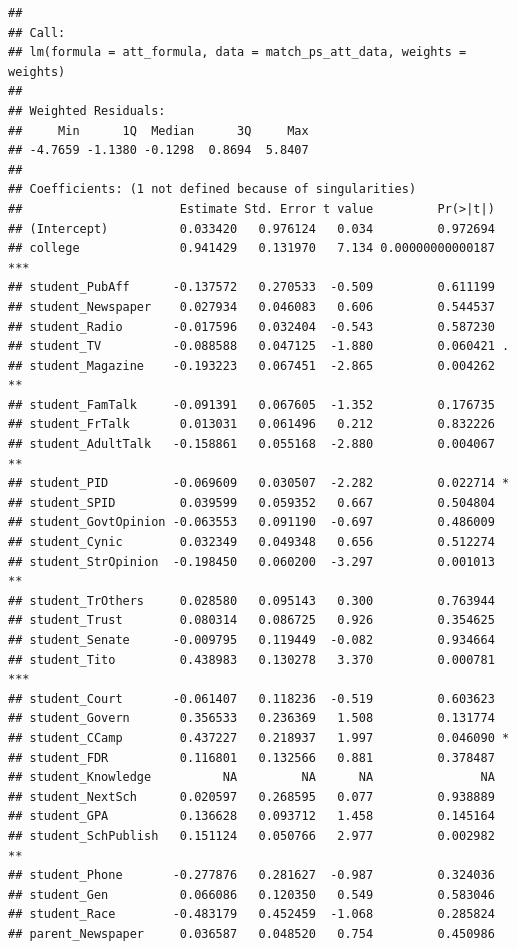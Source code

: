 \documentclass[
]{article}
\begin{document}
\begin{verbatim}
## 
## Call:
## lm(formula = att_formula, data = match_ps_att_data, weights = weights)
## 
## Weighted Residuals:
##     Min      1Q  Median      3Q     Max 
## -4.7659 -1.1380 -0.1298  0.8694  5.8407 
## 
## Coefficients: (1 not defined because of singularities)
##                      Estimate Std. Error t value         Pr(>|t|)    
## (Intercept)          0.033420   0.976124   0.034         0.972694    
## college              0.941429   0.131970   7.134 0.00000000000187 ***
## student_PubAff      -0.137572   0.270533  -0.509         0.611199    
## student_Newspaper    0.027934   0.046083   0.606         0.544537    
## student_Radio       -0.017596   0.032404  -0.543         0.587230    
## student_TV          -0.088588   0.047125  -1.880         0.060421 .  
## student_Magazine    -0.193223   0.067451  -2.865         0.004262 ** 
## student_FamTalk     -0.091391   0.067605  -1.352         0.176735    
## student_FrTalk       0.013031   0.061496   0.212         0.832226    
## student_AdultTalk   -0.158861   0.055168  -2.880         0.004067 ** 
## student_PID         -0.069609   0.030507  -2.282         0.022714 *  
## student_SPID         0.039599   0.059352   0.667         0.504804    
## student_GovtOpinion -0.063553   0.091190  -0.697         0.486009    
## student_Cynic        0.032349   0.049348   0.656         0.512274    
## student_StrOpinion  -0.198450   0.060200  -3.297         0.001013 ** 
## student_TrOthers     0.028580   0.095143   0.300         0.763944    
## student_Trust        0.080314   0.086725   0.926         0.354625    
## student_Senate      -0.009795   0.119449  -0.082         0.934664    
## student_Tito         0.438983   0.130278   3.370         0.000781 ***
## student_Court       -0.061407   0.118236  -0.519         0.603623    
## student_Govern       0.356533   0.236369   1.508         0.131774    
## student_CCamp        0.437227   0.218937   1.997         0.046090 *  
## student_FDR          0.116801   0.132566   0.881         0.378487    
## student_Knowledge          NA         NA      NA               NA    
## student_NextSch      0.020597   0.268595   0.077         0.938889    
## student_GPA          0.136628   0.093712   1.458         0.145164    
## student_SchPublish   0.151124   0.050766   2.977         0.002982 ** 
## student_Phone       -0.277876   0.281627  -0.987         0.324036    
## student_Gen          0.066086   0.120350   0.549         0.583046    
## student_Race        -0.483179   0.452459  -1.068         0.285824    
## parent_Newspaper     0.036587   0.048520   0.754         0.450986    

\end{verbatim}
\end{document}
